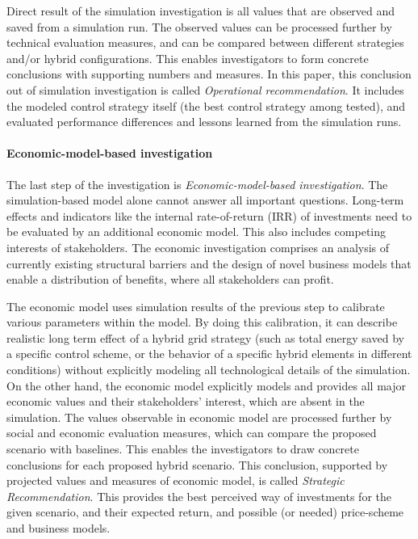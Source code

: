 \documentclass[a4paper,twoside]{article}
\begin{document}
Direct result of the simulation investigation is all values that 
are observed and saved from a simulation run. The observed values can
be processed further by technical evaluation measures, and can be
compared between different strategies and/or hybrid configurations. 
This enables investigators to form concrete conclusions with
supporting numbers and measures. In this paper, this conclusion out of
simulation investigation is called {\em Operational recommendation}. 
It includes the modeled control strategy itself (the best control
strategy among tested), and evaluated performance differences and
lessons learned from the simulation runs. 

\paragraph{Economic-model-based investigation}
The last step of the investigation is {\em Economic-model-based 
  investigation}. 
The simulation-based model alone cannot answer all important
questions. Long-term effects and indicators like the internal
rate-of-return (IRR) of investments need to be evaluated by an
additional economic model.   
This also includes competing interests of stakeholders. 
The economic investigation comprises an analysis of currently existing
structural barriers and the design of novel business models that
enable a distribution of benefits, where all stakeholders can profit.  

The economic model uses simulation results of the previous step
to calibrate various parameters within the model. 
By doing this calibration, it can describe realistic long term effect
of a hybrid grid strategy (such as total energy saved by a specific
control scheme, or the behavior of a specific hybrid elements in
different conditions) without explicitly modeling all technological
details of the simulation. 
On the other hand, the economic model explicitly models and provides
all major economic values and their stakeholders' interest, which are  
absent in the simulation. The values observable in economic model are
processed further by social and economic evaluation measures, which
can compare the proposed scenario with baselines. 
This enables the investigators to draw concrete conclusions for each 
proposed hybrid scenario. This conclusion, supported by projected
values and measures of economic model, is called {\em Strategic
Recommendation}. 
This provides the best perceived way of investments for the given
scenario, and their expected return, and possible (or needed)
price-scheme and business models.    
\end{document}
